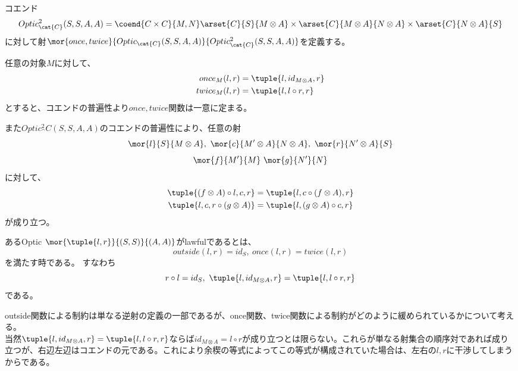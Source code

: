\documentclass[uplatex,dvipdfmx]{jsarticle}
\begin{document}
  \begin{define}
    コエンド\[Optic^2_\cat{C}(S,S,A,A)=\coend{C\times C}{M,N}\arset{C}{S}{M\otimes A}\times\arset{C}{M\otimes A}{N\otimes A}\times\arset{C}{N\otimes A}{S}\]
    に対して射$\mor{once,twice}{Optic_\cat{C}(S,S,A,A)}{Optic^2_\cat{C}(S,S,A,A)}$を定義する。

    任意の対象$M$に対して、
    \begin{align*}
      once_M(l,r) &= \tuple{l,id_{M\otimes A},r}\\
      twice_M(l,r) &= \tuple{l,l\circ r,r}
    \end{align*}
    とすると、コエンドの普遍性より$once,twice$関数は一意に定まる。
  \end{define}
  また$Optic^2_\cat{C}(S,S,A,A)$のコエンドの普遍性により、任意の射\[\mor{l}{S}{M\otimes A},\ \mor{c}{M'\otimes A}{N\otimes A},\ \mor{r}{N'\otimes A}{S}\]\[\mor{f}{M'}{M}\ \mor{g}{N'}{N}\]に対して、
  \begin{align*}
    \tuple{(f\otimes A)\circ l,c,r}&=\tuple{l,c\circ(f\otimes A),r}\\
    \tuple{l,c,r\circ(g\otimes A)} &= \tuple{l,(g\otimes A)\circ c,r}
  \end{align*}
  が成り立つ。
  \begin{define}[lawful性]
    あるOptic $\mor{\tuple{l,r}}{(S,S)}{(A,A)}$がlawfulであるとは、
    \[outside(l,r)=id_S,\ once(l,r)=twice(l,r)\]を満たす時である。
    すなわち\[r\circ l = id_S,\ \tuple{l,id_{M\otimes A},r}=\tuple{l,l\circ r,r}\]である。
  \end{define}
  outside関数による制約は単なる逆射の定義の一部であるが、once関数、twice関数による制約がどのように緩められているかについて考える。\\

  当然$\tuple{l,id_{M\otimes A},r}=\tuple{l,l\circ r,r}$ならば$id_{M\otimes A}=l\circ r$が成り立つとは限らない。これらが単なる射集合の順序対であれば成り立つが、右辺左辺はコエンドの元である。これにより余楔の等式によってこの等式が構成されていた場合は、左右の$l,r$に干渉してしまうからである。

  

\end{document}
